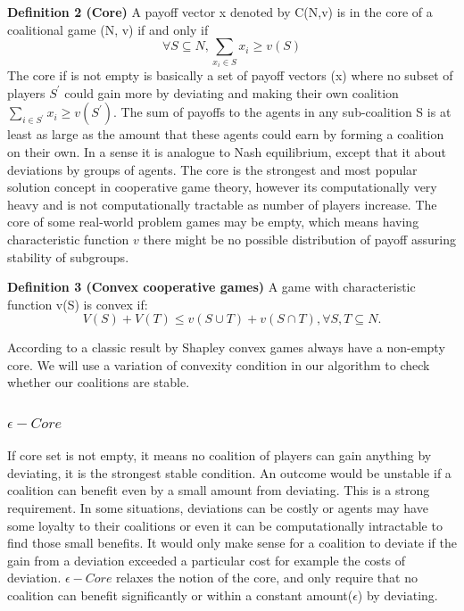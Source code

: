 \documentclass[10pt, conference, compsocconf]{IEEEtran}
\theoremstyle{plain}
\theoremstyle{definition}
\begin{document}
{\bf Definition 2 (Core)} A payoff vector x denoted by C(N,v) is in the core of a coalitional game (N, v) if and only if
\begin{equation}\label{eq:core}
\forall S \subseteq N, \sum_{x_i \in S} x_i \geq v(S)
\end{equation}
The core if is not empty is basically a set of payoff vectors (x) where no subset of players $S^\prime$ could gain more by deviating and making their own coalition $\sum_{i \in S^\prime} x_i \geq v(S^\prime)$. The sum of payoffs to the agents in any sub-coalition S is at least as large as the amount that these agents could earn by forming a coalition on their own. In a sense it is analogue to Nash equilibrium, except that it about deviations by groups of agents. The core is the strongest and most popular solution concept in cooperative game theory, however its computationally very heavy and is not computationally tractable as number of players increase. The core of some real-world problem games may be empty, which means having characteristic function $v$ there might be no possible distribution of payoff assuring stability of subgroups.

{\bf Definition 3 (Convex cooperative games)} A game with characteristic function v(S) is convex if:
\begin{equation}\label{eq:convex}
V(S) + V(T) \leq v(S \cup T) + v (S \cap T), \forall S,T \subseteq N.
\end{equation}

According to a classic result by Shapley \cite{S1971cores} convex games always have a non-empty core. We will use a variation of convexity condition in our algorithm to check whether our coalitions are stable.

\subsubsection{$\epsilon-Core$}\label{s:epsilon}
If core set is not empty, it means no coalition of players can gain anything by deviating, it is the strongest stable condition. An outcome would be unstable if a coalition can benefit even by a small amount from deviating. This is a strong requirement. In some situations, deviations can be costly or agents may have some loyalty to their coalitions or even it can be computationally intractable to find those small benefits. It would only make sense for a coalition to deviate if the gain from a deviation exceeded a particular cost for example the costs of deviation. $\epsilon-Core$ relaxes the notion of the core, and only require that no coalition can benefit significantly or within a constant amount($\epsilon$) by deviating.
\end{document}
